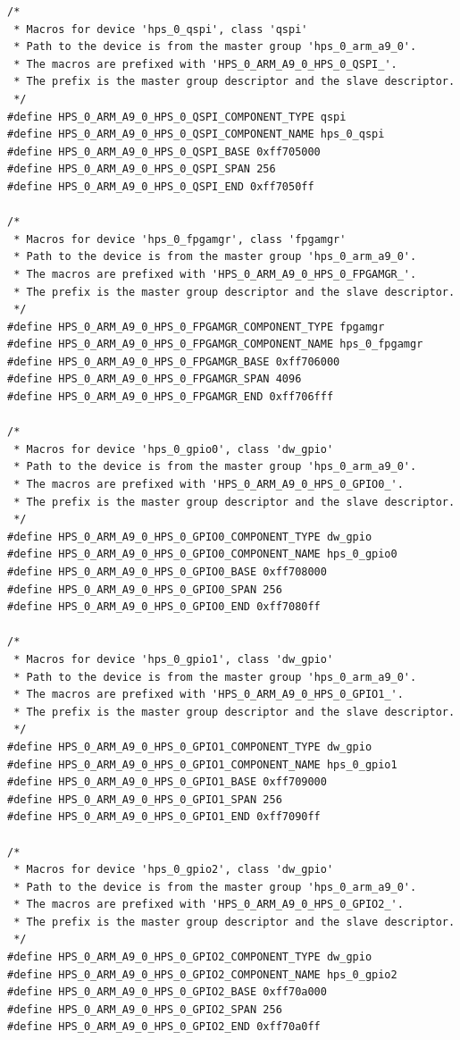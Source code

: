 \documentclass[conference]{IEEEtran}
\begin{document}
\begin{lstlisting}
/*
 * Macros for device 'hps_0_qspi', class 'qspi'
 * Path to the device is from the master group 'hps_0_arm_a9_0'.
 * The macros are prefixed with 'HPS_0_ARM_A9_0_HPS_0_QSPI_'.
 * The prefix is the master group descriptor and the slave descriptor.
 */
#define HPS_0_ARM_A9_0_HPS_0_QSPI_COMPONENT_TYPE qspi
#define HPS_0_ARM_A9_0_HPS_0_QSPI_COMPONENT_NAME hps_0_qspi
#define HPS_0_ARM_A9_0_HPS_0_QSPI_BASE 0xff705000
#define HPS_0_ARM_A9_0_HPS_0_QSPI_SPAN 256
#define HPS_0_ARM_A9_0_HPS_0_QSPI_END 0xff7050ff

/*
 * Macros for device 'hps_0_fpgamgr', class 'fpgamgr'
 * Path to the device is from the master group 'hps_0_arm_a9_0'.
 * The macros are prefixed with 'HPS_0_ARM_A9_0_HPS_0_FPGAMGR_'.
 * The prefix is the master group descriptor and the slave descriptor.
 */
#define HPS_0_ARM_A9_0_HPS_0_FPGAMGR_COMPONENT_TYPE fpgamgr
#define HPS_0_ARM_A9_0_HPS_0_FPGAMGR_COMPONENT_NAME hps_0_fpgamgr
#define HPS_0_ARM_A9_0_HPS_0_FPGAMGR_BASE 0xff706000
#define HPS_0_ARM_A9_0_HPS_0_FPGAMGR_SPAN 4096
#define HPS_0_ARM_A9_0_HPS_0_FPGAMGR_END 0xff706fff

/*
 * Macros for device 'hps_0_gpio0', class 'dw_gpio'
 * Path to the device is from the master group 'hps_0_arm_a9_0'.
 * The macros are prefixed with 'HPS_0_ARM_A9_0_HPS_0_GPIO0_'.
 * The prefix is the master group descriptor and the slave descriptor.
 */
#define HPS_0_ARM_A9_0_HPS_0_GPIO0_COMPONENT_TYPE dw_gpio
#define HPS_0_ARM_A9_0_HPS_0_GPIO0_COMPONENT_NAME hps_0_gpio0
#define HPS_0_ARM_A9_0_HPS_0_GPIO0_BASE 0xff708000
#define HPS_0_ARM_A9_0_HPS_0_GPIO0_SPAN 256
#define HPS_0_ARM_A9_0_HPS_0_GPIO0_END 0xff7080ff

/*
 * Macros for device 'hps_0_gpio1', class 'dw_gpio'
 * Path to the device is from the master group 'hps_0_arm_a9_0'.
 * The macros are prefixed with 'HPS_0_ARM_A9_0_HPS_0_GPIO1_'.
 * The prefix is the master group descriptor and the slave descriptor.
 */
#define HPS_0_ARM_A9_0_HPS_0_GPIO1_COMPONENT_TYPE dw_gpio
#define HPS_0_ARM_A9_0_HPS_0_GPIO1_COMPONENT_NAME hps_0_gpio1
#define HPS_0_ARM_A9_0_HPS_0_GPIO1_BASE 0xff709000
#define HPS_0_ARM_A9_0_HPS_0_GPIO1_SPAN 256
#define HPS_0_ARM_A9_0_HPS_0_GPIO1_END 0xff7090ff

/*
 * Macros for device 'hps_0_gpio2', class 'dw_gpio'
 * Path to the device is from the master group 'hps_0_arm_a9_0'.
 * The macros are prefixed with 'HPS_0_ARM_A9_0_HPS_0_GPIO2_'.
 * The prefix is the master group descriptor and the slave descriptor.
 */
#define HPS_0_ARM_A9_0_HPS_0_GPIO2_COMPONENT_TYPE dw_gpio
#define HPS_0_ARM_A9_0_HPS_0_GPIO2_COMPONENT_NAME hps_0_gpio2
#define HPS_0_ARM_A9_0_HPS_0_GPIO2_BASE 0xff70a000
#define HPS_0_ARM_A9_0_HPS_0_GPIO2_SPAN 256
#define HPS_0_ARM_A9_0_HPS_0_GPIO2_END 0xff70a0ff


\end{lstlisting}
\end{document}
